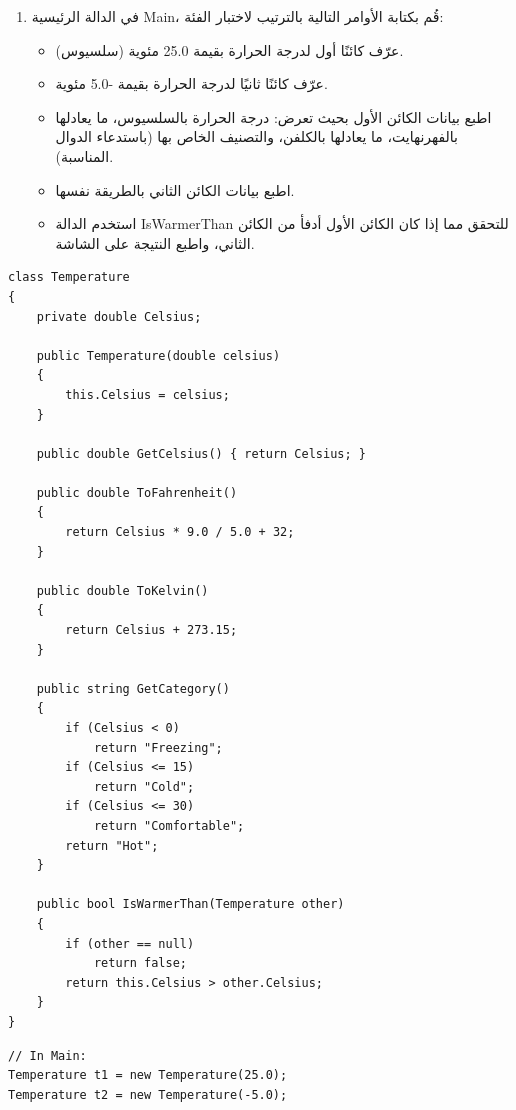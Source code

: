 \documentclass[14pt]{extarticle}
\begin{document}
\begin{enumerate}[itemsep=2em]
\begin{enumerate}[itemsep=1em]
    \item في الدالة الرئيسية \textenglish{Main}، قُم بكتابة الأوامر التالية بالترتيب لاختبار الفئة:
    \begin{itemize}[itemsep=1pt]
        \item عرّف كائنًا أول لدرجة الحرارة بقيمة \textenglish{25.0} مئوية (سلسيوس).
        \item عرّف كائنًا ثانيًا لدرجة الحرارة بقيمة \textenglish{-5.0} مئوية.
        \item اطبع بيانات الكائن الأول بحيث تعرض: درجة الحرارة بالسلسيوس، ما يعادلها بالفهرنهايت، ما يعادلها بالكلفن، والتصنيف الخاص بها (باستدعاء الدوال المناسبة).
        \item اطبع بيانات الكائن الثاني بالطريقة نفسها.
        \item استخدم الدالة \textenglish{IsWarmerThan} للتحقق مما إذا كان الكائن الأول أدفأ من الكائن الثاني، واطبع النتيجة على الشاشة.
    \end{itemize}
\end{enumerate}

\ifwithsols
{\small
\begin{boxSolution}
\begin{english}
\begin{verbatim}
class Temperature
{
    private double Celsius;

    public Temperature(double celsius)
    {
        this.Celsius = celsius;
    }

    public double GetCelsius() { return Celsius; }

    public double ToFahrenheit()
    {
        return Celsius * 9.0 / 5.0 + 32;
    }

    public double ToKelvin()
    {
        return Celsius + 273.15;
    }

    public string GetCategory()
    {
        if (Celsius < 0)
            return "Freezing";
        if (Celsius <= 15)
            return "Cold";
        if (Celsius <= 30)
            return "Comfortable";
        return "Hot";
    }

    public bool IsWarmerThan(Temperature other)
    {
        if (other == null)
            return false;
        return this.Celsius > other.Celsius;
    }
}
\end{verbatim}
\end{english}
\end{boxSolution}
\begin{boxSolution}
\begin{english}
\begin{verbatim}
// In Main:
Temperature t1 = new Temperature(25.0);
Temperature t2 = new Temperature(-5.0);


\end{verbatim}
\end{english}
\end{boxSolution}}
\end{enumerate}
\end{document}
